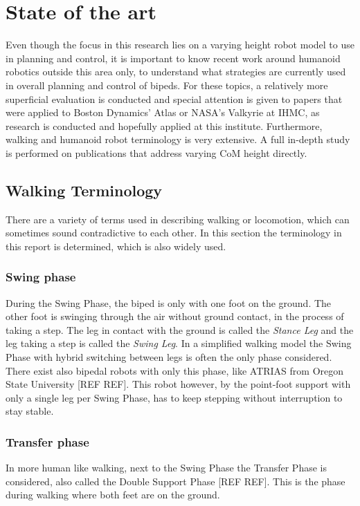 %
\chapter{State of the art}%
Even though the focus in this research lies on a varying height robot model to use in planning and control, it is important to know recent work around humanoid robotics outside this area only, to understand what strategies are currently used in overall planning and control of bipeds. For these topics, a relatively more superficial evaluation is conducted and special attention is given to papers that were applied to Boston Dynamics' Atlas or NASA's Valkyrie at IHMC, as research is conducted and hopefully applied at this institute. Furthermore, walking and humanoid robot terminology is very extensive. A full in-depth study is performed on publications that address varying CoM height directly.

\section{Walking Terminology}
There are a variety of terms used in describing walking or locomotion, which can sometimes sound contradictive to each other. In this section the terminology in this report is determined, which is also widely used.
\subsection{Swing phase}
During the Swing Phase, the biped is only with one foot on the ground. The other foot is swinging through the air without ground contact, in the process of taking a step. The leg in contact with the ground is called the \textit{Stance Leg} and the leg taking a step is called the \textit{Swing Leg}. In a simplified walking model the Swing Phase with hybrid switching between legs is often the only phase considered. There exist also bipedal robots with only this phase, like ATRIAS from Oregon State University [REF REF]. This robot however, by the point-foot support with only a single leg per Swing Phase, has to keep stepping without interruption to stay stable.
\subsection{Transfer phase}
In more human like walking, next to the Swing Phase the Transfer Phase is considered, also called the Double Support Phase [REF REF]. This is the phase during walking where both feet are on the ground.

